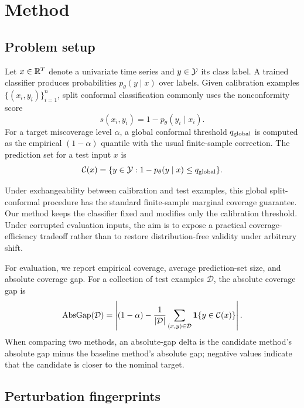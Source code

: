 \section{Method}

\subsection{Problem setup}

Let $x\in\mathbb{R}^T$ denote a univariate time series and $y\in\mathcal{Y}$ its class label. A trained classifier produces probabilities $p_\theta(y\mid x)$ over labels. Given calibration examples $\{(x_i,y_i)\}_{i=1}^n$, split conformal classification commonly uses the nonconformity score
\begin{equation}
    s(x_i,y_i) = 1 - p_\theta(y_i\mid x_i).
\end{equation}
For a target miscoverage level $\alpha$, a global conformal threshold $q_{\mathrm{global}}$ is computed as the empirical $(1-\alpha)$ quantile with the usual finite-sample correction. The prediction set for a test input $x$ is
\begin{equation}
    \mathcal{C}(x) = \{y\in\mathcal{Y}: 1-p_\theta(y\mid x)\leq q_{\mathrm{global}}\}.
\end{equation}

Under exchangeability between calibration and test examples, this global split-conformal procedure has the standard finite-sample marginal coverage guarantee. Our method keeps the classifier fixed and modifies only the calibration threshold. Under corrupted evaluation inputs, the aim is to expose a practical coverage-efficiency tradeoff rather than to restore distribution-free validity under arbitrary shift.

For evaluation, we report empirical coverage, average prediction-set size, and absolute coverage gap. For a collection of test examples $\mathcal{D}$, the absolute coverage gap is
\begin{equation}
    \mathrm{AbsGap}(\mathcal{D}) =
    \left| (1-\alpha) -
    \frac{1}{|\mathcal{D}|}\sum_{(x,y)\in\mathcal{D}}\mathbf{1}\{y\in\mathcal{C}(x)\}
    \right|.
\end{equation}
When comparing two methods, an absolute-gap delta is the candidate method's absolute gap minus the baseline method's absolute gap; negative values indicate that the candidate is closer to the nominal target.

\subsection{Perturbation fingerprints}

